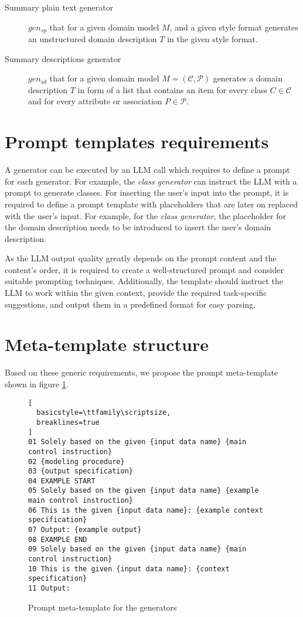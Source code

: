 \begin{description}
\item [Summary plain text generator] $gen_{sp}$ that for a given domain model $M$, and a given style format generates an unstructured domain description $T$ in the given style format.

\item [Summary descriptions generator] $gen_{sd}$ that for a given domain model $M = (\mathcal{C}, \mathcal{P})$ generates a domain description $T$ in form of a list that contains an item for every class $C \in \mathcal{C}$ and for every attribute or association $P \in\mathcal{P}$.
\end{description}


\section{Prompt templates requirements}

A generator can be executed by an LLM call which requires to define a prompt for each generator. For example, the \emph{class generator} can instruct the LLM with a prompt to generate classes. For inserting the user's input into the prompt, it is required to define a prompt template with placeholders that are later on replaced with the user's input. For example, for the \emph{class generator}, the placeholder for the domain description needs to be introduced to insert the user's domain description.

As the LLM output quality greatly depends on the prompt content and the content's order, it is required to create a well-structured prompt and consider suitable prompting techniques. Additionally, the template should instruct the LLM to work within the given context, provide the required task-specific suggestions, and output them in a predefined format for easy parsing.


\section{Meta-template structure}

Based on these generic requirements, we propose the prompt meta-template shown in figure \ref{fig:meta-templates}.

\begin{figure}[!h]
    \centering
\begin{lstlisting}[
  basicstyle=\ttfamily\scriptsize,
  breaklines=true
]
01 Solely based on the given {input data name} {main control instruction}
02 {modeling procedure}
03 {output specification}
04 EXAMPLE START
05 Solely based on the given {input data name} {example main control instruction}
06 This is the given {input data name}: {example context specification}
07 Output: {example output}
08 EXAMPLE END
09 Solely based on the given {input data name} {main control instruction}
10 This is the given {input data name}: {context specification}
11 Output:
\end{lstlisting}
    \caption{\centering Prompt meta-template for the generators}
    \label{fig:meta-templates}
\end{figure}


